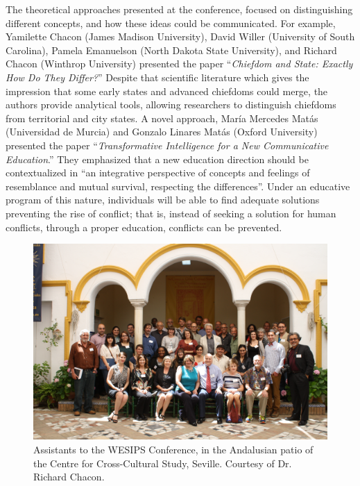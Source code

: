 The theoretical  approaches presented at the conference, focused on distinguishing different concepts, and how these ideas could be communicated. For example, Yamilette Chacon (James Madison University), David Willer (University of South Carolina), Pamela Emanuelson (North Dakota State University), and Richard Chacon (Winthrop University) presented the paper “\textit{Chiefdom and State: Exactly How Do They Differ?}” Despite that scientific literature which gives the impression that some early states and advanced chiefdoms could merge, the authors provide analytical tools, allowing researchers to distinguish chiefdoms from territorial and city states. A novel approach, María Mercedes Matás (Universidad de Murcia) and Gonzalo Linares Matás (Oxford University) presented the paper “\textit{Transformative Intelligence for a New Communicative Education}.” They emphasized that a new education direction should be contextualized in “an integrative perspective of concepts and feelings of resemblance and mutual survival, respecting the differences”. Under an educative program of this nature, individuals will be able to find adequate solutions preventing the rise of conflict; that is, instead of seeking a solution for human conflicts, through a proper education, conflicts can be prevented. 
	\begin{figure}[!ht]
		\includegraphics[width=\linewidth]{figures/WESIPS_Fig2.jpg}
		\centering
		\caption{Assistants to the WESIPS Conference, in the Andalusian patio of the Centre for Cross-Cultural Study, Seville. Courtesy of Dr. Richard Chacon.}
		\label{fig:WESIPS_Fig2}
	\end{figure}
